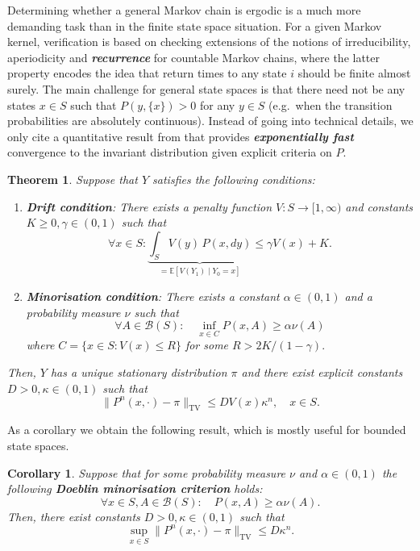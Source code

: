 \documentclass[
]{book}
\newtheorem{theorem}{Theorem}[chapter]
\newtheorem{corollary}{Corollary}[chapter]
\theoremstyle{definition}
\theoremstyle{definition}
\theoremstyle{definition}
\theoremstyle{definition}
\theoremstyle{remark}
\begin{document}
Determining whether a general Markov chain is ergodic is a much more demanding task than in the finite state space situation. For a given Markov kernel, verification is based on checking extensions of the notions of irreducibility, aperiodicity and \textbf{\emph{recurrence}} for countable Markov chains, where the latter property encodes the idea that return times to any state \(i\) should be finite almost surely. The main challenge for general state spaces is that there need not be any states \(x \in S\) such that \(P(y,\{x\}) > 0\) for any \(y \in S\) (e.g.~when the transition probabilities are absolutely continuous). Instead of going into technical details, we only cite a quantitative result from \citep{hairer11} that provides \textbf{\emph{exponentially fast}} convergence to the invariant distribution given explicit criteria on \(P\).

\begin{theorem}
Suppose that \(Y\) satisfies the following conditions:

\begin{enumerate}
\def\labelenumi{\arabic{enumi}.}
\item
  \textbf{\emph{Drift condition}}: There exists a \emph{penalty function} \(V\colon S \to [1,\infty)\) and constants \(K \geq 0, \gamma \in (0,1)\) such that
  \[\forall x \in S: \underbrace{\int_S V(y)\, P(x,dy)}_{= \mathbb{E}[V(Y_1) \mid Y_0 = x]}  \leq \gamma V(x) + K. \]
\item
  \textbf{\emph{Minorisation condition}}: There exists a constant \(\alpha \in (0,1)\) and a probability measure \(\nu\) such that
  \[\forall A \in \mathcal{B}(S): \quad \inf_{x \in C} P(x,A) \geq \alpha \nu(A)\]
  where \(C = \{x \in S: V(x) \leq R\}\) for some \(R > 2K/(1-\gamma).\)
\end{enumerate}

Then, \(Y\) has a unique stationary distribution \(\pi\) and there exist explicit constants \(D > 0, \kappa \in (0,1)\) such that
\[\lVert P^n(x,\cdot) - \pi \rVert_{\mathrm{TV}} \leq DV(x) \kappa^n, \quad x \in S.\]
\end{theorem}

As a corollary we obtain the following result, which is mostly useful for bounded state spaces.

\begin{corollary}
Suppose that for some probability measure \(\nu\) and \(\alpha \in (0,1)\) the following \textbf{\emph{Doeblin minorisation criterion}} holds:
\[\forall x \in S, A \in \mathcal{B}(S): \quad P(x,A) \geq \alpha \nu(A). \]
Then, there exist constants \(D > 0,\kappa \in (0,1)\) such that
\[\sup_{x \in S} \lVert P^n(x,\cdot) - \pi \rVert_{\mathrm{TV}} \leq D\kappa^n.\]
\end{corollary}
\end{document}
